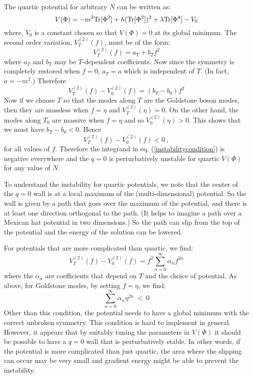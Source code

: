 \documentclass[a4paper,prd,nofootinbib,twocolumn,showpacs]{revtex4}
\begin{document}
The quartic potential for arbitrary $N$ can be written as:
\begin{equation}
V(\Phi ) = - m^2 {\rm Tr}[ \Phi ^2 ]+ h ( {\rm Tr}[\Phi ^2  ])^2 +
  \lambda {\rm Tr}[\Phi ^4]  - V_0 
\label{quarticV}
\end{equation}
where, $V_0$ is a constant chosen so that $V(\Phi )=0$ at its
global minimum. The second order variation, $V^{(2)}_T(f)$, 
must be of the form:
\begin{equation}
V^{(2)}_T(f) = a_T + b_T f^2
\label{V2form}
\end{equation}
where $a_T$ and $b_T$ may be $T$-dependent coefficients.
Now since the symmetry is completely restored when
$f=0$, $a_T =a$ which is independent of $T$. (In fact,
$a = -m^2$.) Therefore 
\begin{equation}
V^{(2)}_T(f) - V^{(2)}_0 (f) =  (b_T - b_0) f^2
\label{V2-V2form}
\end{equation}
Now if we choose $T$ so that the modes along $T$ are the 
Goldstone boson modes, then they are massless when $f=\eta$
and $V^{(2)}_T(\eta ) =0$. On the other hand, the modes
along $T_0$ are massive when $f=\eta$ and so
$V^{(2)}_0 (\eta ) > 0$. This shows that we must
have $b_T - b_0 < 0$. Hence
\begin{equation}
V^{(2)}_T(f) - V^{(2)}_0 (f) < 0 \ ,
\label{V2-V2lessthan0}
\end{equation}
for all values of $f$. Therefore the integrand in 
eq. (\ref{instabilitycondition}) is negative everywhere
and the $q=0$ is perturbatively unstable for quartic
$V(\Phi )$ for any value of $N$.

To understand the instability for quartic potentials,
we note that the center of the $q=0$ wall is at a local
maximum of the (multi-dimensional) potential. So the
wall is given by a path that goes over the maximum of
the potential, and there is at least one direction
orthogonal to the path. (It helps to imagine a path
over a Mexican hat potential in two dimensions.) So
the path can slip from the top of the potential and
the energy of the solution can be lowered. 

{}For potentials that are more complicated than quartic,
we find:
\begin{equation}
V^{(2)}_T(f) - V^{(2)}_0 (f) =  
              f^2 \sum_{n=0}^\infty \alpha_n f^{2n}
\label{V2-V2generalV}
\end{equation}
where the $\alpha_n$ are coefficients that depend on
$T$ and the choice of potential. As above, for Goldstone
modes, by setting $f=\eta$, we find:
\begin{equation}
\sum_{n=0}^\infty \alpha_n \eta^{2n} ~ < ~ 0
\label{generalcondition}
\end{equation}
Other than this condition, the potential needs to have
a global minimum with the correct unbroken symmetry.
This condition is hard to implement in general. However,
it appears that by suitably tuning the parameters in
$V(\Phi )$ it should be possible to have a $q=0$ wall
that is perturbatively stable. In other words, if
the potential is more complicated than just quartic,
the area where the slipping can occur may be very
small and gradient energy might be able to prevent 
the instability.
\end{document}
